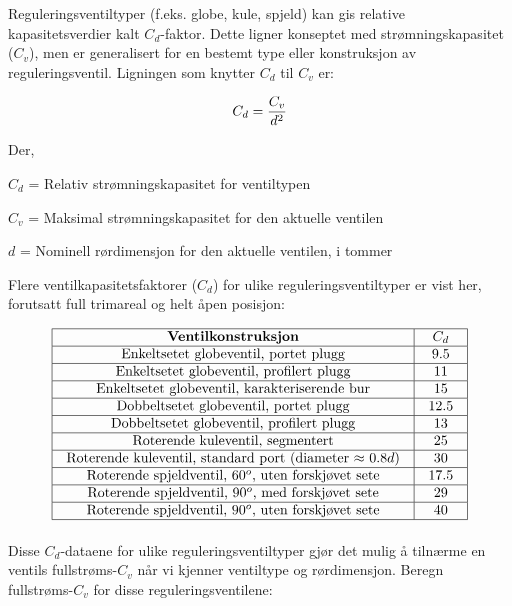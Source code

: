

Reguleringsventiltyper (f.eks. globe, kule, spjeld) kan gis relative kapasitetsverdier kalt $C_d$-faktor. Dette ligner konseptet med strømningskapasitet ($C_v$), men er generalisert for en bestemt type eller konstruksjon av reguleringsventil. Ligningen som knytter $C_d$ til $C_v$ er:

$$C_d = {C_v \over d^2}$$

\noindent
Der,

$C_d$ = Relativ strømningskapasitet for ventiltypen

$C_v$ = Maksimal strømningskapasitet for den aktuelle ventilen

$d$ = Nominell rørdimensjon for den aktuelle ventilen, i tommer

\vskip 10pt

Flere ventilkapasitetsfaktorer ($C_d$) for ulike reguleringsventiltyper er vist her, forutsatt full trimareal og helt åpen posisjon:


$$\vbox{\offinterlineskip
\halign{\strut
\vrule \quad\hfil # \ \hfil &
\vrule \quad\hfil # \ \hfil \vrule \cr
\noalign{\hrule}
%
{\bf Ventilkonstruksjon} & $C_d$ \cr
%
\noalign{\hrule}
%
Enkeltsetet globeventil, portet plugg & 9.5 \cr
%
\noalign{\hrule}
%
Enkeltsetet globeventil, profilert plugg & 11 \cr
%
\noalign{\hrule}
%
Enkeltsetet globeventil, karakteriserende bur & 15 \cr
%
\noalign{\hrule}
%
Dobbeltsetet globeventil, portet plugg & 12.5 \cr
%
\noalign{\hrule}
%
Dobbeltsetet globeventil, profilert plugg & 13 \cr
%
\noalign{\hrule}
%
Roterende kuleventil, segmentert & 25 \cr
%
\noalign{\hrule}
%
Roterende kuleventil, standard port (diameter $\approx$ 0.8$d$) & 30 \cr
%
\noalign{\hrule}
%
Roterende spjeldventil, 60$^{o}$, uten forskjøvet sete & 17.5 \cr
%
\noalign{\hrule}
%
Roterende spjeldventil, 90$^{o}$, med forskjøvet sete & 29 \cr
%
\noalign{\hrule}
%
Roterende spjeldventil, 90$^{o}$, uten forskjøvet sete & 40 \cr
%
\noalign{\hrule}
} %
}$$ %

Disse $C_d$-dataene for ulike reguleringsventiltyper gjør det mulig å tilnærme en ventils fullstrøms-$C_v$ når vi kjenner ventiltype og rørdimensjon. Beregn fullstrøms-$C_v$ for disse reguleringsventilene:

